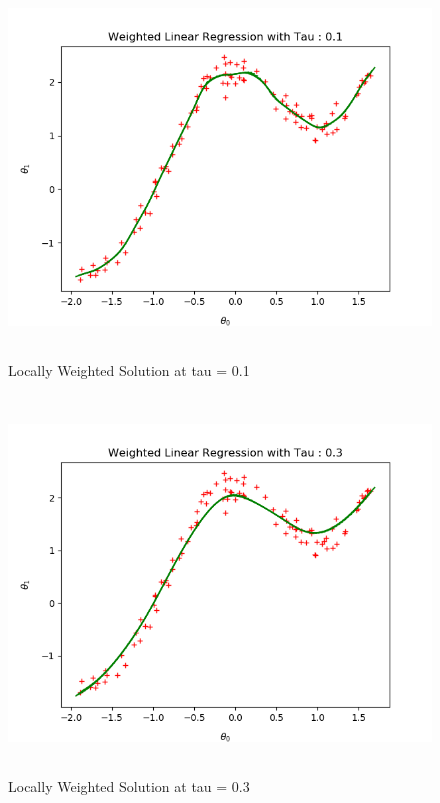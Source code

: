 \documentclass[10pt]{article}
\begin{document}
\begin{figure}[H]
	\includegraphics[width = 15cm,height = 10cm]{Q2_b01}
	\caption{Locally Weighted Solution at tau = 0.1}
\end{figure}

\begin{figure}[H]
	\includegraphics[width = 15cm,height = 10cm]{Q2_b03}
	\caption{Locally Weighted Solution at tau = 0.3}
\end{figure}
\end{document}

